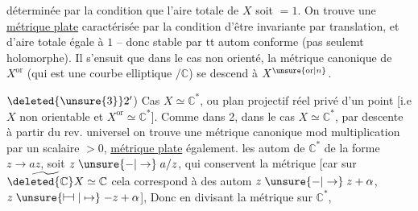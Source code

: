 
déterminée par la condition que l'aire totale de $X$ soit $=1$. On trouve une \uline{métrique plate} caractérisée par la condition d'être invariante par translation, et d'aire  totale égale à $1$ -- donc stable par tt autom conforme (pas seulemt holomorphe). Il s'ensuit que dans le cas non orienté, la métrique canonique de $X^{\mathrm{or}}$ (qui est une courbe elliptique $/\mathbb C$) se descend à $X^{\unsure{\mathrm{or}|n}}$.

$\deleted{\unsure{3}}2'$) Cas $X\simeq\mathbb C^*$, ou  plan projectif réel privé d'un point [i.e $X$ non orientable et $X^{\mathrm{or}}\simeq\mathbb C^*$]. Comme dans 2, dans le cas $X\simeq\mathbb C^*$,  par descente à partir du rev. universel on trouve une métrique canonique mod multiplication par un scalaire $>0$, \uline{métrique plate} également.  les autom de $\mathbb C^*$   de la forme $z\longrightarrow az$, soit $z\mathrel{\unsure{-|\to}}a/z$, qui conservent la métrique [car sur $\widetilde{\deleted{\mathbb C}X}\simeq\mathbb C$ cela correspond à des autom $z\mathrel{\unsure{-|\to}}z+\alpha$, $z\mathrel{\unsure{\vdash\!\dashv|\mapsto}}-z+\alpha$], Donc en divisant la métrique sur $\mathbb C^*$, 
